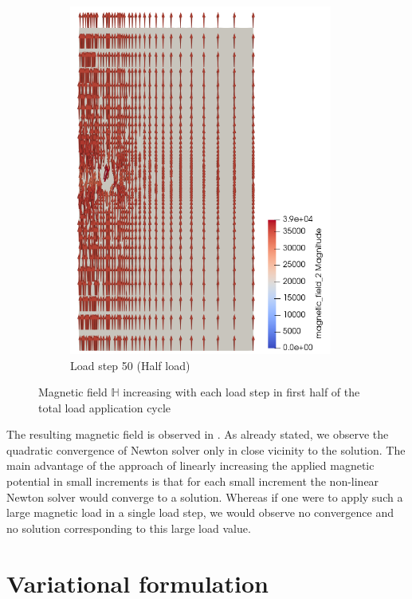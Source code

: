 \documentclass[11pt,a4paper,final]{article}
\begin{document}
\begin{figure}[h]
\begin{subfigure}{0.32\textwidth}
\includegraphics[width=0.95\textwidth]{magnetic_field_50.png}
\caption{Load step 50 (Half load)}
\label{fig:3.7.3}
\end{subfigure}
\caption{Magnetic field $\mathbb{H}$ increasing with each load step in first half of the total load application cycle}
\label{fig:3.7}
\end{figure}

The resulting magnetic field is observed in . As already stated, we observe the quadratic convergence of Newton solver only in close vicinity to the solution. The main advantage of the approach of linearly increasing the applied magnetic potential in small increments is that for each small increment the non-linear Newton solver would converge to a solution. Whereas if one were to apply such a large magnetic load in a single load step, we would observe no convergence and no solution corresponding to this large load value. \par 

\section{Variational formulation}
\end{document}
